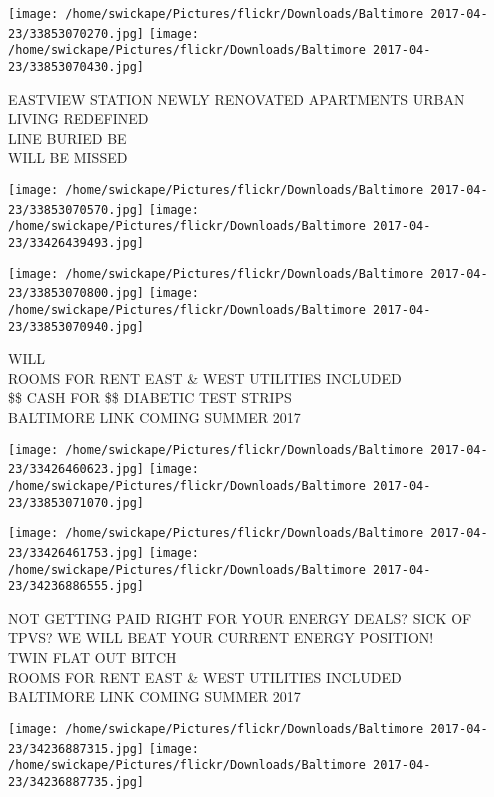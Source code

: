\documentclass[10pt,letterpaper]{article}
\begin{document}
\vspace{0.25in}
\texttt{[image: /home/swickape/Pictures/flickr/Downloads/Baltimore 2017-04-23/33853070270.jpg]}
\texttt{[image: /home/swickape/Pictures/flickr/Downloads/Baltimore 2017-04-23/33853070430.jpg]}

EASTVIEW STATION NEWLY RENOVATED APARTMENTS URBAN LIVING REDEFINED\\
LINE BURIED BE\\
WILL BE MISSED\\
\pagebreak

\texttt{[image: /home/swickape/Pictures/flickr/Downloads/Baltimore 2017-04-23/33853070570.jpg]}
\texttt{[image: /home/swickape/Pictures/flickr/Downloads/Baltimore 2017-04-23/33426439493.jpg]}

\texttt{[image: /home/swickape/Pictures/flickr/Downloads/Baltimore 2017-04-23/33853070800.jpg]}
\texttt{[image: /home/swickape/Pictures/flickr/Downloads/Baltimore 2017-04-23/33853070940.jpg]}

WILL\\
ROOMS FOR RENT EAST \& WEST UTILITIES INCLUDED\\
\$\$ CASH FOR \$\$ DIABETIC TEST STRIPS\\
BALTIMORE LINK COMING SUMMER 2017\\
\pagebreak

\texttt{[image: /home/swickape/Pictures/flickr/Downloads/Baltimore 2017-04-23/33426460623.jpg]}
\texttt{[image: /home/swickape/Pictures/flickr/Downloads/Baltimore 2017-04-23/33853071070.jpg]}

\texttt{[image: /home/swickape/Pictures/flickr/Downloads/Baltimore 2017-04-23/33426461753.jpg]}
\texttt{[image: /home/swickape/Pictures/flickr/Downloads/Baltimore 2017-04-23/34236886555.jpg]}

NOT GETTING PAID RIGHT FOR YOUR ENERGY DEALS?  SICK OF TPVS?  WE WILL BEAT YOUR CURRENT ENERGY POSITION!\\
TWIN FLAT OUT BITCH\\
ROOMS FOR RENT EAST \& WEST UTILITIES INCLUDED\\
BALTIMORE LINK COMING SUMMER 2017\\
\pagebreak

\texttt{[image: /home/swickape/Pictures/flickr/Downloads/Baltimore 2017-04-23/34236887315.jpg]}
\texttt{[image: /home/swickape/Pictures/flickr/Downloads/Baltimore 2017-04-23/34236887735.jpg]}
\end{document}

